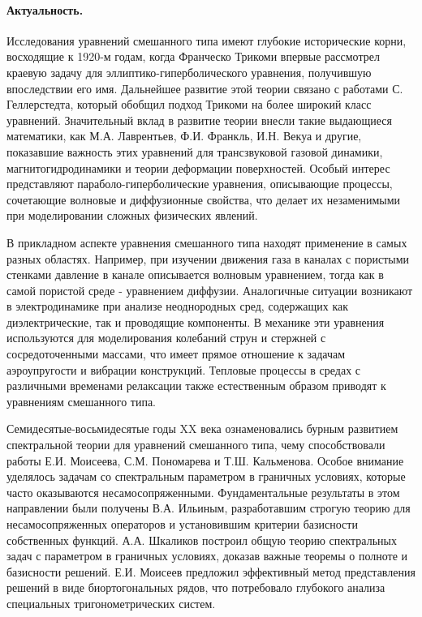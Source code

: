 \begin{vkrthesis}
\paragraph{Актуальность.}
Исследования уравнений смешанного типа имеют глубокие исторические корни, восходящие к 1920-м годам, когда Франческо Трикоми впервые рассмотрел краевую задачу для эллиптико-гиперболического уравнения, получившую впоследствии его имя. Дальнейшее развитие этой теории связано с работами С. Геллерстедта, который обобщил подход Трикоми на более широкий класс уравнений. Значительный вклад в развитие теории внесли такие выдающиеся математики, как М.А. Лаврентьев, Ф.И. Франкль, И.Н. Векуа и другие, показавшие важность этих уравнений для трансзвуковой газовой динамики, магнитогидродинамики и теории деформации поверхностей. Особый интерес представляют параболо-гиперболические уравнения, описывающие процессы, сочетающие волновые и диффузионные свойства, что делает их незаменимыми при моделировании сложных физических явлений.

В прикладном аспекте уравнения смешанного типа находят применение в самых разных областях. Например, при изучении движения газа в каналах с пористыми стенками давление в канале описывается волновым уравнением, тогда как в самой пористой среде - уравнением диффузии. Аналогичные ситуации возникают в электродинамике при анализе неоднородных сред, содержащих как диэлектрические, так и проводящие компоненты. В механике эти уравнения используются для моделирования колебаний струн и стержней с сосредоточенными массами, что имеет прямое отношение к задачам аэроупругости и вибрации конструкций. Тепловые процессы в средах с различными временами релаксации также естественным образом приводят к уравнениям смешанного типа.
 
Семидесятые-восьмидесятые годы XX века ознаменовались бурным развитием спектральной теории для уравнений смешанного типа, чему способствовали работы Е.И. Моисеева, С.М. Пономарева и Т.Ш. Кальменова. Особое внимание уделялось задачам со спектральным параметром в граничных условиях, которые часто оказываются несамосопряженными. Фундаментальные результаты в этом направлении были получены В.А. Ильиным, разработавшим строгую теорию для несамосопряженных операторов и установившим критерии базисности собственных функций. А.А. Шкаликов построил общую теорию спектральных задач с параметром в граничных условиях, доказав важные теоремы о полноте и базисности решений. Е.И. Моисеев предложил эффективный метод представления решений в виде биортогональных рядов, что потребовало глубокого анализа специальных тригонометрических систем.


\end{vkrthesis}
